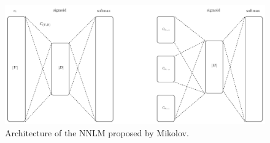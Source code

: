 \begin{figure}[hptb!]
    \centering
    \includegraphics[width=1.0\textwidth]{images/mikolov-fnnl-latex.pdf} 
    \caption{Architecture of the \ac{NNLM} proposed by Mikolov.}
    \label{fig:mikolov_nnlm_architecture}
\end{figure}
  












